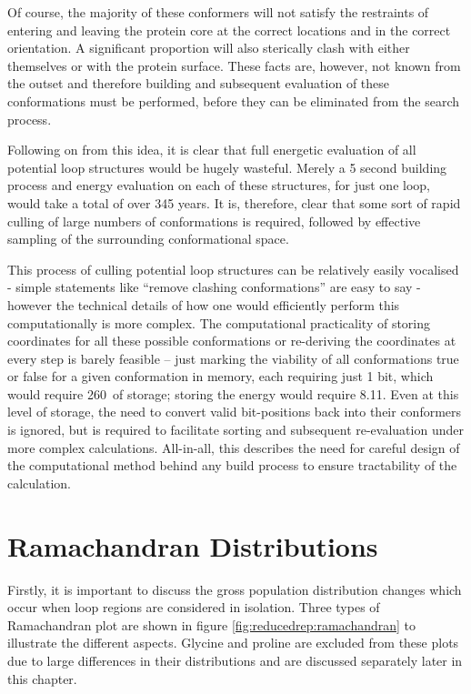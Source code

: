 Of course, the majority of these conformers will not satisfy the restraints of entering and leaving the protein core at the correct locations and in the correct orientation. A significant proportion will also sterically clash with either themselves or with the protein surface. These facts are, however, not known from the outset and therefore building and subsequent evaluation of these conformations must be performed, before they can be eliminated from the search process. 

Following on from this idea, it is clear that full energetic evaluation of all potential loop structures would be hugely wasteful. Merely a 5 second building process and energy evaluation on each of these structures, for just one loop, would take a total of over 345 years. It is, therefore, clear that some sort of rapid culling of large numbers of conformations  is required, followed by effective sampling of the surrounding conformational space.

This process of culling potential loop structures can be relatively easily vocalised - simple statements like ``remove clashing conformations'' are easy to say - however the technical details of how one would efficiently perform this computationally is more complex. The computational practicality of storing coordinates for all these possible conformations or re-deriving the coordinates at every step is barely feasible -- just marking the viability of all conformations true or false for a given  conformation in memory, each requiring just 1 bit, which would require 260\mb\ of storage; storing the energy would require 8.11\gb. Even at this level of storage, the need to convert valid bit-positions back into their conformers is ignored, but is required to facilitate sorting and subsequent re-evaluation under more complex calculations.
All-in-all, this describes the need for careful design of the computational method behind any build process to ensure tractability of the calculation.   



\section{Ramachandran Distributions}

Firstly, it is important to discuss the gross population distribution changes which occur when loop regions are considered in isolation. Three types of Ramachandran plot are shown in figure \ref{fig:reducedrep:ramachandran} to illustrate the different aspects. Glycine and proline are excluded from these plots due to large differences in their distributions and are discussed separately later in this chapter.

